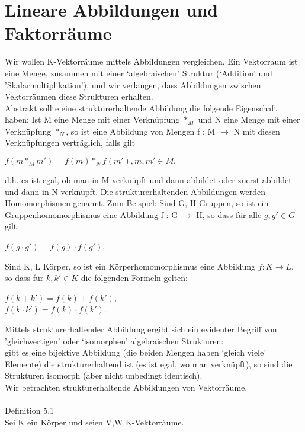 \documentclass[fontsize=10pt]{scrartcl}
\begin{document}
\section{Lineare Abbildungen und Faktorräume}
Wir wollen K-Vektorräume mittels Abbildungen vergleichen. Ein Vektorraum ist eine Menge, zusammen mit einer ‘algebraischen’ Struktur (‘Addition’ und ’Skalarmultiplikation’), und wir verlangen, dass Abbildungen zwischen Vektorräumen diese Strukturen erhalten.\\ 
Abstrakt sollte eine strukturerhaltende Abbildung die folgende Eigenschaft haben: Ist M eine Menge mit einer Verknüpfung $*_M$ und N eine Menge mit einer Verknüpfung $*_N$, so ist eine Abbildung von Mengen f : M $\to$ N mit diesen Verknüpfungen verträglich, falls gilt
\begin{center}
$f (m *_M m') = f (m) *_N f(m'), m,m' \in M,$
\end{center}
d.h. es ist egal, ob man in M verknüpft und dann abbildet oder zuerst abbildet und dann in N verknüpft. Die strukturerhaltenden Abbildungen werden Homomorphismen genannt. 
Zum Beispiel: Sind G, H Gruppen, so ist ein Gruppenhomomorphismus eine Abbildung f : G $\to$ H, so dass für alle $g,g' \in G$ gilt:
\begin{center}
$f (g \cdot g') = f(g) \cdot f(g')$.
\end{center}
Sind K, L Körper, so ist ein Körperhomomorphismus eine Abbildung $f : K \to L$, so dass für $k, k' \in K$ die folgenden Formeln gelten:
\begin{center}
$f(k + k') = f(k) + f(k')$,\\ 
$f(k \cdot k') = f(k) \cdot f(k')$.
\end{center}
Mittels strukturerhaltender Abbildung ergibt sich ein evidenter Begriff von ’gleichwertigen’ oder ‘isomorphen’ algebraischen Strukturen:\\ 
gibt es eine bijektive Abbildung (die beiden Mengen haben ‘gleich viele’ Elemente) die strukturerhaltend ist (es ist egal, wo man verknüpft), so sind die Strukturen isomorph (aber nicht unbedingt identisch).\\
Wir betrachten strukturerhaltende Abbildungen von Vektorräume.\\
\\
Definition 5.1\\
Sei K ein Körper und seien V,W K-Vektorräume.
\end{document}
